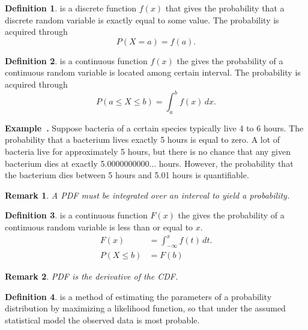 \documentclass[a4paper]{article}
\theoremstyle{definition}
\newtheorem{definition}{Definition}
\theoremstyle{plain}
\newtheorem{remark}{Remark}
\newenvironment{example}[1][]{\refstepcounter{example}\par\medskip
   \noindent \textbf{Example~\theexample. #1} \rmfamily}{\medskip}
\newcounter{example}{Example}
\begin{document}
\begin{definition}
 is a discrete function $f(x)$ that gives the probability that a discrete random variable is exactly equal to some value. The probability is acquired through
\begin{equation*}
    P(X=a)=f(a).
\end{equation*}
\end{definition}

\begin{definition}
 is a continuous function $f(x)$ the gives the probability of a continuous random variable is located among certain interval. The probability is acquired through
\begin{equation*}
    P(a\leq X\leq b)=\int _{a}^{b}f(x)\,dx.
\end{equation*}
\end{definition}

\begin{example}
Suppose bacteria of a certain species typically live 4 to 6 hours. The probability that a bacterium lives exactly 5 hours is equal to zero. A lot of bacteria live for approximately 5 hours, but there is no chance that any given bacterium dies at exactly 5.0000000000... hours. However, the probability that the bacterium dies between 5 hours and 5.01 hours is quantifiable. 
\end{example}

\begin{remark}
A PDF must be integrated over an interval to yield a probability. 
\end{remark}

\begin{definition}
 is a continuous function $F(x)$ the gives the probability of a continuous random variable is less than or equal to $x$.
\begin{align*}
    F(x)&=\int ^{x}_{-\infty}f(t)\,dt.\\
    P(X\leq b)&=F(b)
\end{align*}
\end{definition}

\begin{remark}
PDF is the derivative of the CDF.
\end{remark}

\begin{definition}
 is a method of estimating the parameters of a probability distribution by maximizing a likelihood function, so that under the assumed statistical model the observed data is most probable.
\end{definition}
\end{document}
